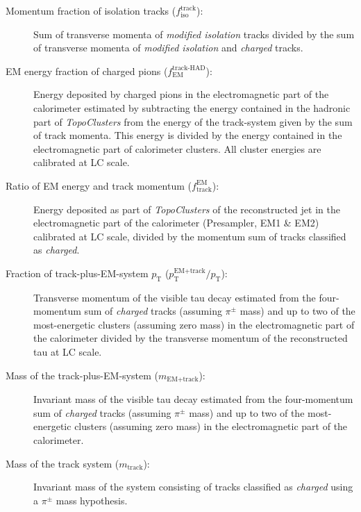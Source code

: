 \begin{description}
\item[Momentum fraction of isolation tracks ($f_\text{iso}^\text{track}$):] Sum
  of transverse momenta of \emph{modified isolation} tracks divided by the sum
  of transverse momenta of \emph{modified isolation} and \emph{charged} tracks.

\item[EM energy fraction of charged pions ($f_\text{EM}^\text{track-HAD}$):]
  Energy deposited by charged pions in the electromagnetic part of the
  calorimeter estimated by subtracting the energy contained in the hadronic part
  of \emph{TopoClusters} from the energy of the track-system given by the sum of
  track momenta. This energy is divided by the energy contained in the
  electromagnetic part of calorimeter clusters. All cluster energies are
  calibrated at LC scale.

\item[Ratio of EM energy and track momentum ($f_\text{track}^\text{EM}$):]
  Energy deposited as part of \emph{TopoClusters} of the reconstructed jet in
  the electromagnetic part of the calorimeter (Presampler, EM1 \& EM2)
  calibrated at LC scale, divided by the momentum sum of tracks classified as
  \emph{charged}.

\item[Fraction of track-plus-EM-system $p_\text{T}$
  ($p_\text{T}^\text{EM+track} / p_\text{T}$):] Transverse momentum of the
  visible tau decay estimated from the four-momentum sum of \emph{charged}
  tracks (assuming $\pi^\pm$ mass) and up to two of the most-energetic clusters
  (assuming zero mass) in the electromagnetic part of the calorimeter divided by
  the transverse momentum of the reconstructed tau at LC scale.

\item[Mass of the track-plus-EM-system ($m_\text{EM+track}$):] Invariant mass of
  the visible tau decay estimated from the four-momentum sum of \emph{charged}
  tracks (assuming $\pi^\pm$ mass) and up to two of the most-energetic clusters
  (assuming zero mass) in the electromagnetic part of the calorimeter.

\item[Mass of the track system ($m_\text{track}$):] Invariant mass of the system
  consisting of tracks classified as \emph{charged} using a $\pi^\pm$ mass
  hypothesis.
\end{description}
